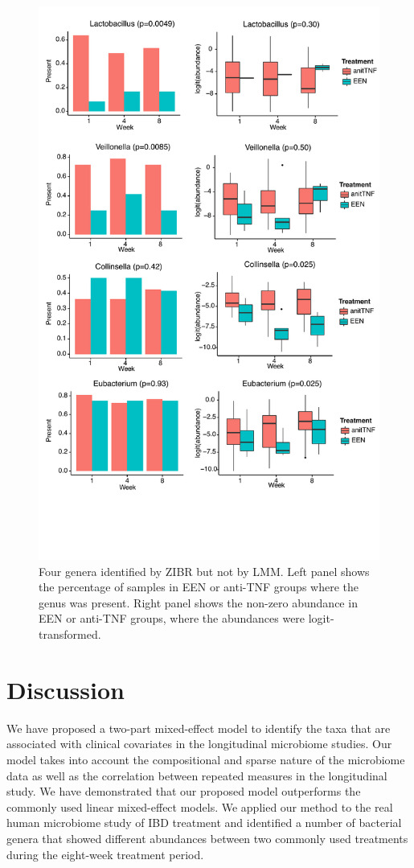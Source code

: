 \begin{figure}[!tpb]%
\centerline{\includegraphics[scale=0.6,trim=0 120 0 0,clip]{Figure/F44_ZIBR_Three_Extra.pdf}}
\caption[Four  genera identified by ZIBR but not by LMM]{Four  genera identified by ZIBR but not by LMM. Left panel shows the percentage of samples in EEN or anti-TNF  groups where the  genus was present. Right panel shows the non-zero abundance in EEN or anti-TNF groups, where the abundances were logit-transformed.}
\label{Fig4}
\end{figure}


\section{Discussion}
We have proposed a two-part mixed-effect model to identify the taxa that are associated with clinical covariates in the longitudinal microbiome studies. Our model takes into account the compositional and sparse nature of the microbiome data as well as the correlation between repeated measures in the longitudinal study.  We  have demonstrated that our proposed model outperforms the commonly  used  linear mixed-effect models.  We  applied our method to the real human microbiome study of  IBD treatment  and identified a number of bacterial genera  that showed different abundances between two commonly used treatments during the eight-week treatment period. 

